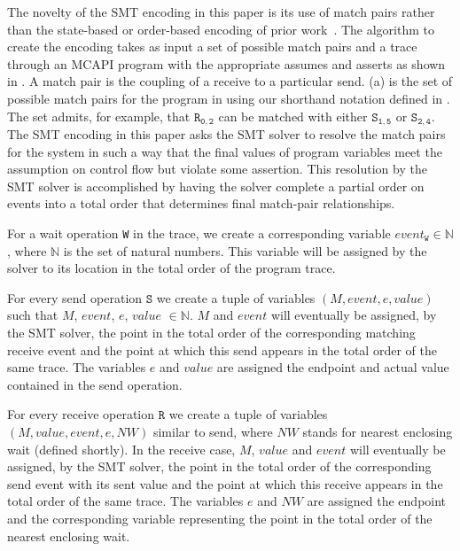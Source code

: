 The novelty of the SMT encoding in this paper is its use of match pairs rather than the state-based or order-based encoding of prior work~\cite{elwakil:padtad10,elwakil:atva10}. The algorithm to create the encoding takes as input a set of possible match pairs and a trace through an MCAPI program with the appropriate assumes and asserts as shown in . A match pair is the coupling of a receive to a particular send. (a) is the set of possible match pairs for the program in  using our shorthand notation defined in . The set admits, for example, that $\mathtt{R_{0,2}}$ can be matched with either $\mathtt{S_{1,5}}$ or $\mathtt{S_{2,4}}$. The SMT encoding in this paper asks the SMT solver to resolve the match pairs for the system in such a way that the final values of program variables meet the assumption on control flow but violate some assertion. This resolution by the SMT solver is accomplished by having the solver complete a partial order on events into a total order that determines final match-pair relationships.
\begin{definition}
For a wait operation \texttt{W} in the trace, we create a corresponding variable
$\mathit{event}_\mathtt{W} \in \mathbb{N}$, where $\mathbb{N}$ is the set of natural numbers. This variable will be assigned by the solver to its location in the total order of the program trace.
\label{def:event}
\end{definition}
\begin{definition}
For every send operation $\mathtt{S}$ we create a tuple of variables
$(M,\mathit{event}, e,\mathit{value})$ such that $\mathit{M}$,
$\mathit{event}$, $\mathit{e}$, $\mathit{value}$ $ \in
\mathbb{N}$. $M$ and $\mathit{event}$ will eventually be assigned, by
the SMT solver, the point in the total order of the corresponding matching receive event and the point at which this send appears in the
total order of the same trace. The variables $e$ and $\mathit{value}$ are
assigned the endpoint and actual value contained in the send
operation.
\label{def:snd}
\end{definition}
\begin{definition}
For every receive operation $\mathtt{R}$ we create a tuple of
variables $(M,\mathit{value},\mathit{event},e,\mathit{NW})$ similar to
send, where $\mathit{NW}$ stands for nearest enclosing wait (defined shortly). In the receive case, $M$, $\mathit{value}$ and $\mathit{event}$ will eventually
be assigned, by the SMT solver, the point in the total order of the
corresponding send event with its sent value
and the point at which this receive appears in the total order of the same
trace. The variables $e$ and $\mathit{NW}$ are assigned the endpoint
and the corresponding variable representing the point in the total order of the nearest enclosing wait.
\label{def:rcv}
\end{definition}
